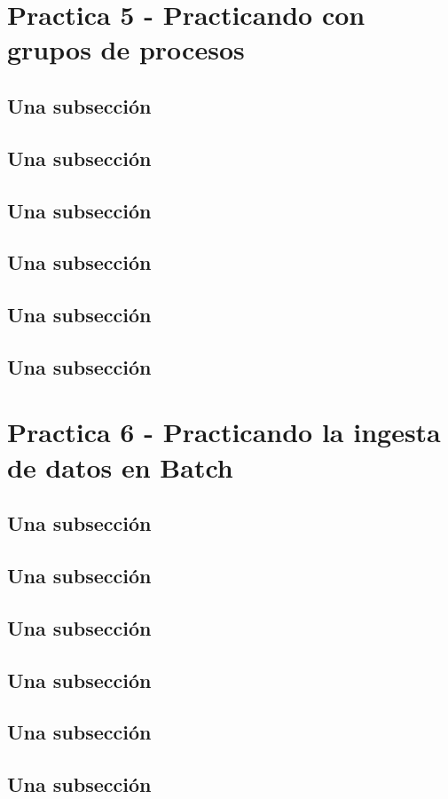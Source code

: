 \documentclass[12pt,a4paper]{article}
\begin{document}
\section{Practica 5 - Practicando con grupos de procesos}
\subsection{Una subsección}
\subsection{Una subsección}
\subsection{Una subsección}
\subsection{Una subsección}
\subsection{Una subsección}
\subsection{Una subsección}
\section{Practica 6 - Practicando la ingesta de datos en Batch}
\subsection{Una subsección}
\subsection{Una subsección}
\subsection{Una subsección}
\subsection{Una subsección}
\subsection{Una subsección}
\subsection{Una subsección}
\end{document}
